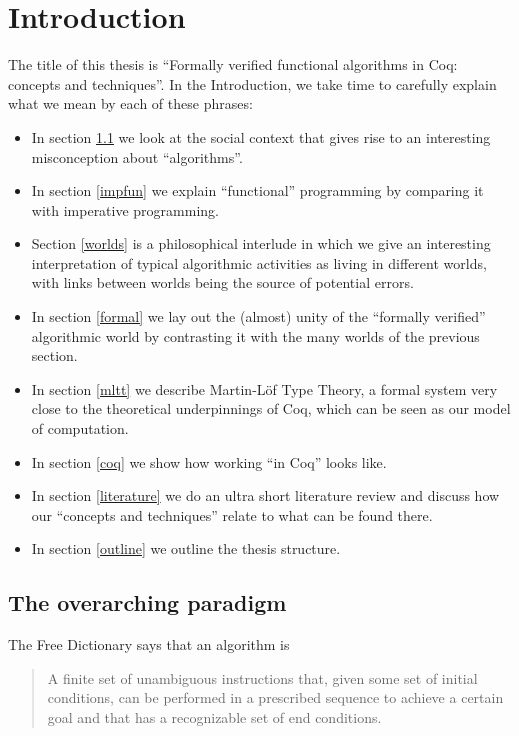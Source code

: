 \documentclass[declaration,mgr,english,shortabstract]{iithesis}
\author         {Wojciech Kołowski}
\date           {\sout{Czerwiec '20 chyba że koronawirus} \\ \sout{Jednak raczej wrzesień} \\ \sout{Z września też nici, ale spoko} \\ Może w marcu '21 się uda.} %
\begin{document}

\chapter{Introduction} \label{introduction}

The title of this thesis is ``Formally verified functional algorithms in Coq: concepts and techniques''. In the Introduction, we take time to carefully explain what we mean by each of these phrases:

\begin{itemize}
    \item In section \ref{paradigm} we look at the social context that gives rise to an interesting misconception about ``algorithms''.
    \item In section \ref{impfun} we explain ``functional'' programming by comparing it with imperative programming.
    \item Section \ref{worlds} is a philosophical interlude in which we give an interesting interpretation of typical algorithmic activities as living in different worlds, with links between worlds being the source of potential errors.
    \item In section \ref{formal} we lay out the (almost) unity of the ``formally verified'' algorithmic world by contrasting it with the many worlds of the previous section.
    \item In section \ref{mltt} we describe Martin-L\"{o}f Type Theory, a formal system very close to the theoretical underpinnings of Coq, which can be seen as our model of computation.
    \item In section \ref{coq} we show how working ``in Coq'' looks like.
    \item In section \ref{literature} we do an ultra short literature review and discuss how our ``concepts and techniques'' relate to what can be found there.
    \item In section \ref{outline} we outline the thesis structure.
\end{itemize}

\section{The overarching paradigm} \label{paradigm}

The Free Dictionary says \cite{TheFreeDictionary} that an algorithm is

\begin{quote}
    A finite set of unambiguous instructions that, given some set of initial conditions, can be performed in a prescribed sequence to achieve a certain goal and that has a recognizable set of end conditions.
\end{quote}
\end{document}
